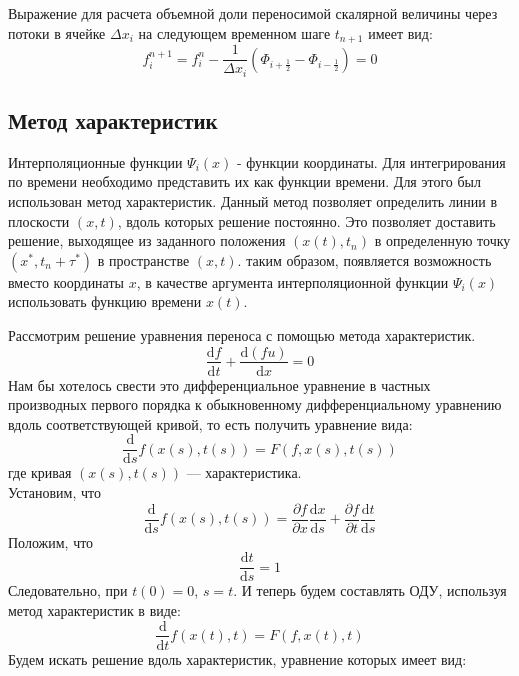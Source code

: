 \documentclass[10pt,a4paper]{article}
\begin{document}
Выражение для расчета объемной доли переносимой скалярной величины через потоки в ячейке $\Delta x_i$ на следующем временном шаге $t_{n+1}$ имеет вид:
\begin{equation}
\label{fiNextFlows}
f_i^{n+1}=f_i^n
-
\frac{1}{\Delta x_i} (
\Phi_{i+\frac{1}{2}}
-
\Phi_{i-\frac{1}{2}}
)=0
\end{equation}

\subsection{Метод характеристик}
Интерполяционные функции $\Psi_i(x)$ - функции координаты. Для интегрирования по времени необходимо представить их как функции времени. Для этого был использован метод характеристик. Данный метод позволяет определить линии в плоскости $(x, t)$, вдоль которых решение постоянно. Это позволяет доставить решение, выходящее из заданного положения $(x(t), t_n)$ в определенную точку $(x^*, t_n+\tau^*)$ в пространстве $(x, t)$. таким образом, появляется возможность вместо координаты $x$, в качестве аргумента интерполяционной функции $\Psi_i(x)$ использовать функцию времени $x(t)$.
\begin{comment}
https://ru.wikipedia.org/wiki/%
\end{comment}
Рассмотрим решение уравнения переноса с помощью метода характеристик.
\begin{equation}
\frac{\text{d}f}{\text{d}t} + \frac{\text{d}(f u)}{\text{d}x}=0
\end{equation}
Нам бы хотелось свести это дифференциальное уравнение в частных производных первого порядка к обыкновенному дифференциальному уравнению вдоль соответствующей кривой, то есть получить уравнение вида:
\[
\frac{\text{d}}{\text{d}s}f(x(s),t(s))=F(f,x(s),t(s))
\]
где кривая $(x(s),t(s))$ — характеристика.\\
Установим, что
\begin{equation}
\label{eqn:CharacteristicsMethodEq}
\frac{\text{d}}{\text{d}s}f(x(s),t(s))=\frac{\partial f}{\partial x}\frac{\text{d}x}{\text{d}s}+\frac{\partial f}{\partial t}\frac{\text{d}t}{\text{d}s}
\end{equation}
Положим, что
\[
\frac{\text{d}t}{\text{d}s}=1
\]
Следовательно, при $t(0)=0$, $s=t$. И теперь будем составлять ОДУ, используя метод характеристик в виде:
\[
\frac{\text{d}}{\text{d}t}f(x(t),t)=F(f,x(t),t)
\]
Будем искать решение вдоль характеристик, уравнение которых имеет вид:
\end{document}
